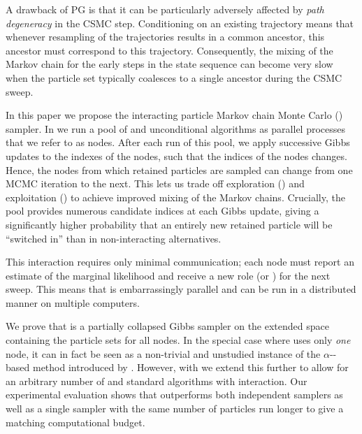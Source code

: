 A drawback of PG is that it can be particularly adversely affected by \emph{path degeneracy} in the CSMC step.  Conditioning on an existing trajectory means that whenever resampling of the trajectories results in a common ancestor, this ancestor must correspond to this trajectory.  Consequently, the mixing of the Markov chain for the early steps in the state sequence can become very slow when the particle set typically coalesces to a single ancestor during the CSMC sweep.

In this paper we propose the interacting particle Markov chain Monte Carlo (\ipmcmc) sampler. In \ipmcmc we run a pool of \csmc and unconditional \smc algorithms as parallel processes that we refer to as nodes. After each run of this pool, we apply successive Gibbs updates to the indexes of the \csmc nodes, such that the indices of the \csmc nodes changes. Hence, the nodes from which retained particles are sampled can change from one MCMC iteration to the next. This lets us trade off exploration (\smc) and exploitation (\csmc) to achieve improved mixing of the Markov chains. Crucially, the pool provides numerous candidate indices at each Gibbs update, giving a significantly higher probability that an entirely new retained particle will be ``switched in'' than in non-interacting alternatives.

This interaction requires only minimal communication; each node must report an estimate of the marginal likelihood and receive a new role (\smc or \csmc) for the next sweep. This means that \ipmcmc is embarrassingly parallel and can be run in a distributed manner on multiple computers.


We prove that \ipmcmc is a partially collapsed Gibbs sampler on the extended space containing the particle sets for all nodes. In the special case where \ipmcmc uses only \emph{one} \csmc node, it can in fact be seen as a non-trivial and unstudied instance of the $\alpha$-\smc-based \citep{whiteley2016} \pmcmc method introduced by \citet{huggins2015}. However, with \ipmcmc we extend this further to allow for an arbitrary number of \csmc and standard \smc algorithms with interaction. Our experimental evaluation shows that \ipmcmc outperforms both independent \pg samplers as well as a single \pg sampler with the same number of particles run longer to give a matching computational budget.

